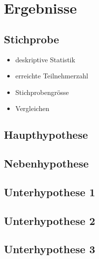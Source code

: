 %
%
\let\raggedsection\centering 
\chapter{Ergebnisse}
\let\raggedsection\raggedright 
\glsresetall
\section{Stichprobe}\label{label.stichprobe}
\begin{itemize}
      \item deskriptive Statistik
      \item erreichte Teilnehmerzahl
      \item Stichprobengrösse
      \item Vergleichen 
\end{itemize}
\section{Haupthypothese}\label{label.haupthypothese}
\section{Nebenhypothese}\label{label.nebenhypothese}
\section{Unterhypothese 1}\label{label.unterhypothese1}
\section{Unterhypothese 2}\label{label.unterhypothese2}
\section{Unterhypothese 3}\label{label.unterhypothese3}


